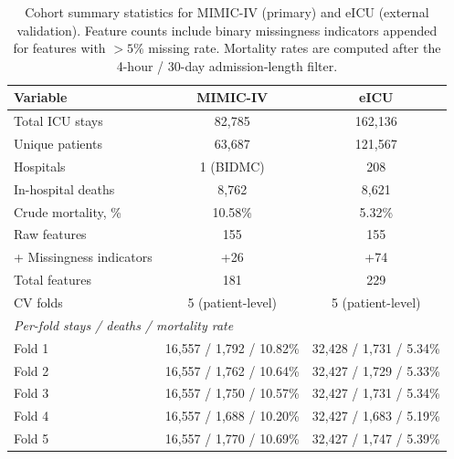 \documentclass[a4paper,fleqn,longmktitle]{cas-sc}
\begin{document}
	\begin{table}[h]
		\centering
		\caption{Cohort summary statistics for MIMIC-IV (primary) and eICU
			(external validation). Feature counts include binary missingness
			indicators appended for features with $>5\%$ missing rate.
			Mortality rates are computed after the 4-hour / 30-day
			admission-length filter.}
		\label{tab:eicu_stats}
		\small
		\begin{tabular}{lcc}
			\toprule
			\textbf{Variable} & \textbf{MIMIC-IV} & \textbf{eICU} \\
			\midrule
			Total ICU stays          & 82{,}785          & 162{,}136 \\
			Unique patients          & 63{,}687          & 121{,}567 \\
			Hospitals                & 1 (BIDMC)         & 208 \\
			In-hospital deaths       & 8{,}762           & 8{,}621 \\
			Crude mortality, \%      & 10.58\%           & 5.32\% \\
			Raw features             & 155               & 155 \\
			+ Missingness indicators & +26               & +74 \\
			Total features           & 181               & 229 \\
			CV folds                 & 5 (patient-level) & 5 (patient-level) \\
			\midrule
			\multicolumn{3}{l}{\textit{Per-fold stays / deaths / mortality rate}} \\
			Fold 1 & 16{,}557 / 1{,}792 / 10.82\% & 32{,}428 / 1{,}731 / 5.34\% \\
			Fold 2 & 16{,}557 / 1{,}762 / 10.64\% & 32{,}427 / 1{,}729 / 5.33\% \\
			Fold 3 & 16{,}557 / 1{,}750 / 10.57\% & 32{,}427 / 1{,}731 / 5.34\% \\
			Fold 4 & 16{,}557 / 1{,}688 / 10.20\% & 32{,}427 / 1{,}683 / 5.19\% \\
			Fold 5 & 16{,}557 / 1{,}770 / 10.69\% & 32{,}427 / 1{,}747 / 5.39\% \\
			\bottomrule
		\end{tabular}
	\end{table}
	\FloatBarrier
\end{document}

